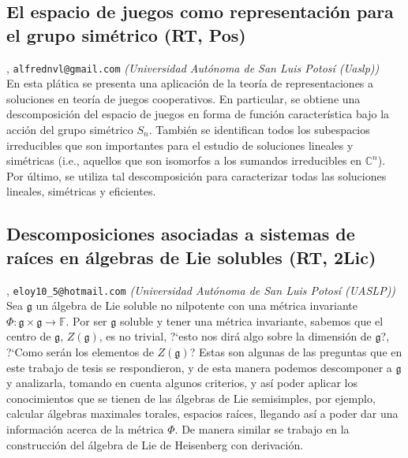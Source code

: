 \subsection{\sffamily El espacio de juegos como representaci\'on para el grupo sim\'etrico {\footnotesize (RT, Pos)}} \label{reg-660} 
, {\tt alfrednvl@gmail.com}  {\slshape (Universidad Aut\'onoma de San Luis Potos\'i (Uaslp))}\\
          \noindent En esta pl\'atica se presenta una aplicaci\'on de la teor\'ia de representaciones a soluciones en teor\'ia de juegos cooperativos. En particular, se obtiene una descomposici\'on del espacio de juegos en forma de funci\'on caracter\'istica bajo la acci\'on del grupo sim\'etrico $S_{n}$. Tambi\'en se identifican todos los subespacios irreducibles que son importantes para el estudio de soluciones lineales y sim\'etricas (i.e., aquellos que son isomorfos a los sumandos irreducibles en $ \mathbb{C}^{n}$). Por \'ultimo, se utiliza tal descomposici\'on para caracterizar todas las soluciones lineales, sim\'etricas y eficientes.
\subsection{\sffamily Descomposiciones asociadas a sistemas de ra\'ices  en \'algebras de Lie solubles {\footnotesize (RT, 2Lic)}} \label{reg-814} 
, {\tt eloy10\_5@hotmail.com}  {\slshape (Universidad Aut\'onoma de San Luis Potos\'i (UASLP))}\\
          \noindent  Sea $\mathfrak{g}$ un \'algebra de Lie soluble no nilpotente con una m\'etrica invariante $ \Phi : \mathfrak{g} \times \mathfrak{g} \longrightarrow \mathbb{F}$. Por ser $ \mathfrak{g}$ soluble y tener una m\'etrica invariante, sabemos que el centro de $ \mathfrak{g}$, $ Z( \mathfrak{g} ) $, es no trivial, ?`esto nos dir\'a algo sobre la dimensi\'on de $\mathfrak{g}$?, ?`Como ser\'an los elementos de $Z(\mathfrak{g})$? Estas son algunas de las preguntas que en este trabajo de tesis se respondieron, y de esta manera podemos descomponer a $\mathfrak{g}$ y analizarla, tomando en cuenta algunos criterios, y as\'i poder aplicar los conocimientos que se tienen de las \'algebras de Lie semisimples, por ejemplo, calcular \'algebras maximales torales, espacios ra\'ices, llegando as\'i a poder dar una informaci\'on acerca de la m\'etrica $\Phi$. De manera similar se trabajo en la construcci\'on del \'algebra de Lie de Heisenberg con derivaci\'on.
